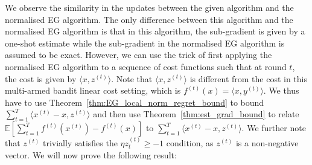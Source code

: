We observe the similarity in the updates between the given algorithm and the normalised EG algorithm. The only difference between this algorithm and the normalised EG algorithm is that in this algorithm, the sub-gradient is given by a one-shot estimate while the sub-gradient in the normalised EG algorithm is assumed to be exact. 
However, we can use the trick of first applying the normalised EG algorithm to a sequence of cost functions such that at round $t$, the cost is given by $\langle x, z^{(t)} \rangle$. Note that $\langle x, z^{(t)} \rangle$ is different from the cost in this multi-armed bandit linear cost setting, which is $f^{(t)}(x) = \langle x, y^{(t)} \rangle$. We thus have to use Theorem~\ref{thm:EG_local_norm_regret_bound} to bound $\sum_{t=1}^T \langle x^{(t)} - x, z^{(t)} \rangle$ and then use Theorem~\ref{thm:est_grad_bound} to relate $\mathbb{E}\left[\sum_{t=1}^T  f^{(t)}(x^{(t)}) - f^{(t)}(x)\right]$ to $\sum_{t=1}^T \langle x^{(t)} - x, z^{(t)} \rangle$. We further note that $z^{(t)}$ trivially satisfies the $\eta z^{(t)}_t \geq -1$ condition, as $z^{(t)}$ is a non-negative vector. We will now prove the following result:

